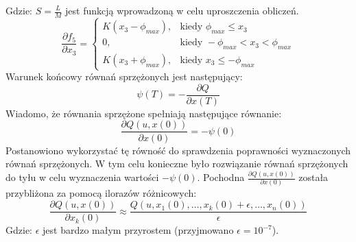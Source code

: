 \noindent Gdzie:\newline
\(S=\frac{L}{M}\) jest funkcją wprowadzoną w celu uproszczenia obliczeń.
\begin{equation}
\frac{\partial f_5}{\partial x_3}=
	\begin{cases}
	K(x_3-\phi_{max}), & \text{kiedy } \phi_{max}\leqslant x_3\\
	0, & \text{kiedy } -\phi_{max}<x_3<\phi_{max}\\
	K(x_3+\phi_{max}), & \text{kiedy } x_3\leqslant -\phi_{max}
	\end{cases}
\end{equation}
Warunek końcowy równań sprzężonych jest następujący:
\begin{equation}
\psi(T)=-\frac{\partial Q}{\partial x(T)}
\end{equation}
Wiadomo, że równania sprzężone spełniają następujące równanie:
\begin{equation}
\frac{\partial Q(u,x(0))}{\partial x(0)}=-\psi(0)
\label{eq:check_psi}
\end{equation}
Postanowiono wykorzystać tę równość do sprawdzenia poprawności wyznaczonych równań sprzężonych. W tym celu konieczne było rozwiązanie równań sprzężonych do tyłu w celu wyznaczenia wartości \(-\psi(0)\). Pochodna \(\frac{\partial Q(u,x(0))}{\partial x(0)}\) została przybliżona za pomocą ilorazów różnicowych:
\begin{equation}
\frac{\partial Q(u,x(0))}{\partial x_k(0)}\approx\frac{Q(u,x_1(0),\dots, x_k(0)+\epsilon,\dots,x_n(0))}{\epsilon}
\end{equation}
\noindent Gdzie:\newline
\(\epsilon\) jest bardzo małym przyrostem (przyjmowano \(\epsilon=10^{-7}\)).

